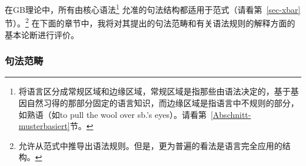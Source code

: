 在GB理论中，所有由核心语法\footnote{
\citet[--8]{Chomsky81a}将语言区分成常规区域和边缘区域，常规区域是指那些由语法决定的，基于基因自然习得的那部分固定的语言知识，而边缘区域是指语言中不规则的部分，如熟语（如to pull the wool over sb.'s eyes）。请看第~\ref{Abschnitt-musterbasiert}节。
}
允准的句法结构都适用于\xbar 范式（请看第~\ref{sec-xbar}节）。\footnote{
\citet[]{Chomsky70a} 允许从\xbar 范式中推导出语法规则。但是，更为普遍的看法是语言完全应用\xbar 的结构。
}
在下面的章节中，我将对其提出的句法范畴和有关语法规则的解释方面的基本论断进行评价。

\subsubsection{句法范畴}
\label{GB-syntaktische-categoryn}

\largerpage

